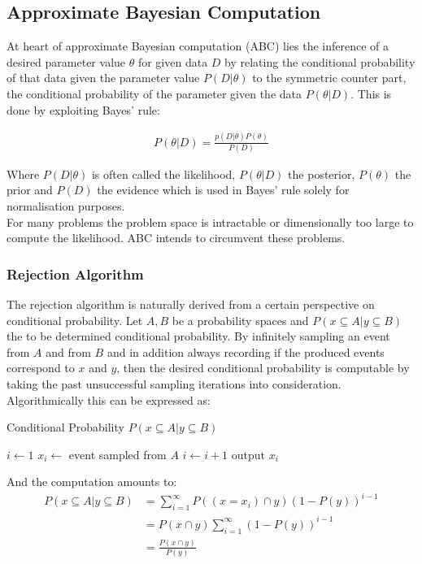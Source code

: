 \documentclass[a4paper, 11pt]{article}
\begin{document}
\subsection{Approximate Bayesian Computation}

At heart of approximate Bayesian computation (ABC) lies the inference of a desired parameter value $\theta$ for given data $D$ by relating the conditional probability of that data given the parameter value $P(D | \theta)$ to the symmetric counter part, the conditional probability of the parameter given the data $P(\theta | D)$. This is done by exploiting Bayes' rule:

\begin{align*}
P(\theta | D) = \frac{p(D | \theta) P(\theta)}{P(D)}
\end{align*}

Where $P(D | \theta)$ is often called the likelihood, $P(\theta | D)$ the posterior, $P(\theta)$ the prior and $P(D)$ the evidence which is used in Bayes' rule solely for normalisation purposes. \\
For many problems the problem space is intractable or dimensionally too large to compute the likelihood. ABC intends to circumvent these problems.

\subsubsection{Rejection Algorithm}
The rejection algorithm is naturally derived from a certain perspective on conditional probability. Let $A, B$ be a probability spaces and $P(x \subseteq A|y \subseteq B)$ the to be determined conditional probability. By infinitely sampling an event from $A$ and from $B$ and in addition always recording if the produced events correspond to $x$ and $y$, then the desired conditional probability is computable by taking the past unsuccessful sampling iterations into consideration. Algorithmically this can be expressed as:

\begin{algorithm}
\caption{Conditional Probability $P(x \subseteq A|y \subseteq B)$}\label{euclid}
\begin{algorithmic}[1]
\State $i \gets 1$
\For {$\infty$}
\Repeat
\State $x_i \gets$ event sampled from $A$
\State $i \gets i + 1$
\State output $x_i$
\EndFor
\end{algorithmic}
\end{algorithm}

And the computation amounts to:
\begin{align*}
P(x \subseteq A|y \subseteq B) &= \sum^{\infty}_{i=1} P((x = x_i) \cap y)(1-P(y))^{i-1} \\
&= P(x \cap y)  \sum^{\infty}_{i=1} (1-P(y))^{i-1} \\
&= \frac{P(x \cap y)}{P(y)}
\end{align*}
\end{document}

